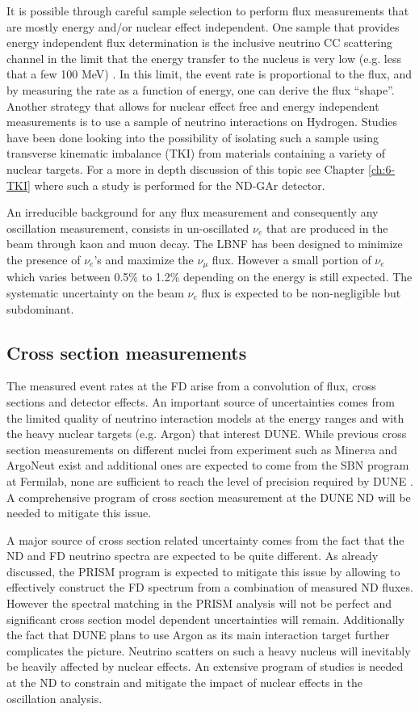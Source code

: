 It is possible through careful sample selection to perform flux measurements that are mostly energy and/or nuclear effect independent. One sample that provides energy independent flux determination is the inclusive neutrino CC scattering channel in the limit that the energy transfer to the nucleus is very low (e.g. less that a few 100 MeV) \cite{Bodek:2012uu}.  In this limit, the event rate is proportional to the flux, and by measuring the rate as a function of energy, one can derive the flux \enquote{shape}. Another strategy that allows for nuclear effect free and energy independent measurements is to use a sample of neutrino interactions on Hydrogen. Studies have been done looking into the possibility of isolating such a sample using transverse kinematic imbalance (TKI) from materials containing a variety of nuclear targets. For a more in depth discussion of this topic see Chapter \ref{ch:6-TKI} where such a study is performed for the ND-GAr detector.

An irreducible background for any flux measurement and consequently any oscillation measurement, consists in un-oscillated $\nu_e$ that are produced in the beam through kaon and muon decay. The LBNF has been designed to minimize the presence of $\nu_e$'s and maximize the $\nu_\mu$ flux. However a small portion of $\nu_e$ which varies between 0.5\% to 1.2\% depending on the energy is still expected. The systematic uncertainty on the beam $\nu_e$ flux is expected to be non-negligible but subdominant.

\subsection{Cross section measurements}
\label{Sec:Cross Section}

The measured event rates at the FD arise from a convolution of flux, cross sections and detector effects. An important source of uncertainties comes from the limited quality of neutrino interaction models at the energy ranges and with the heavy nuclear targets (e.g. Argon) that interest DUNE. While previous cross section measurements on different nuclei from experiment such as Miner$v$a and ArgoNeut exist and additional ones are expected to come from the SBN program at Fermilab, none are sufficient to reach the level of precision required by DUNE \cite{DUNE:2021NDCDR}. A comprehensive program of cross section measurement at the DUNE ND will be needed to mitigate this issue.

A major source of cross section related uncertainty comes from the fact that the ND and FD neutrino spectra are expected to be quite different. As already discussed, the PRISM program is expected to mitigate this issue by allowing to effectively construct the FD spectrum from a combination of measured ND fluxes. However the spectral matching in the PRISM analysis will not be perfect and significant cross section model dependent uncertainties will remain. Additionally the fact that DUNE plans to use Argon as its main interaction target further complicates the picture. Neutrino scatters on such a heavy nucleus will inevitably be heavily affected by nuclear effects. An extensive program of studies is needed at the ND to constrain and mitigate the impact of nuclear effects in the oscillation analysis.

